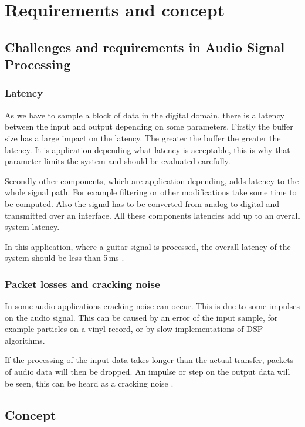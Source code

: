 \section{Requirements and concept}

\subsection{Challenges and requirements in Audio Signal Processing}

\subsubsection{Latency}

As we have to sample a block of data in the digital domain, there is a latency between the input and output
depending on some parameters. Firstly the buffer size has a large impact on the latency. The greater the buffer the
greater the latency. It is application depending what latency is acceptable, this is why that parameter
limits the system and should be evaluated carefully.

Secondly other components, which are application depending, adds latency to the whole signal path.
For example filtering or other modifications take some time to be computed. Also the signal has to
be converted from analog to digital and transmitted over an interface. All these components latencies add
up to an overall system latency. 

In this application, where a guitar signal is processed, the overall latency of the system should be less
than 5\,ms \cite{beckmann_dsp}.

\subsubsection{Packet losses and cracking noise}

In some audio applications cracking noise can occur. This is due to
some impulses on the audio signal. This can be caused by an error of the input sample, for example particles
on a vinyl record, or by slow implementations of \ac{DSP}-algorithms.

If the processing of the input data takes longer than the actual transfer, packets of audio data will
then be dropped. An impulse or step on the output data will be seen, this can be heard as a cracking noise
\cite{stotz_audio_video}.

\subsection{Concept}

